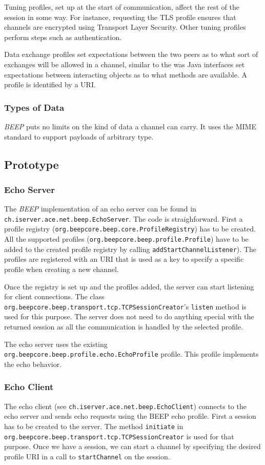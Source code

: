 Tuning profiles, set up at the start of communication, affect the rest of the session in some way. For instance, requesting the TLS profile ensures that channels are encrypted using Transport Layer Security. Other tuning profiles perform steps such as authentication.

Data exchange profiles set expectations between the two peers as to what sort of exchanges will be allowed in a channel, similar to the was Java interfaces set expectations between interacting objects as to what methods are available. A profile is identified by a URI.

\subsubsection{Types of Data}
\emph{BEEP} puts no limits on the kind of data a channel can carry. It uses the MIME standard to support payloads of arbitrary type.



\subsection{Prototype}
\subsubsection{Echo Server}
The \emph{BEEP} implementation of an echo server can be found in \texttt{ch.iserver.ace.net.beep.EchoServer}. The code is straighforward. First a profile registry (\texttt{org.beepcore.beep.core.ProfileRegistry}) has to be created. All the supported profiles (\texttt{org.beepcore.beep.profile.Profile}) have to be added to the created profile registry by calling \texttt{addStartChannelListener}). The profiles are registered with an URI that is used as a key to specify a specific profile when creating a new channel.

Once the registry is set up and the profiles added, the server can start listening for client connections. The class \texttt{org.beepcore.beep.transport.tcp.TCPSessionCreator}'s \texttt{listen} method is used for this purpose. The server does not need to do anything special with the returned session as all the communication is handled by the selected profile.

The echo server uses the existing \texttt{org.beepcore.beep.profile.echo.EchoProfile} profile. This profile implements the echo behavior.

\subsubsection{Echo Client}
The echo client (see \texttt{ch.iserver.ace.net.beep.EchoClient}) connects to the echo server and sends echo requests using the BEEP echo profile. First a session has to be created to the server. The method \texttt{initiate} in \texttt{org.beepcore.beep.transport.tcp.TCPSessionCreator} is used for that purpose. Once we have a session, we can start a channel by specifying the desired profile URI in a call to \texttt{startChannel} on the session.

